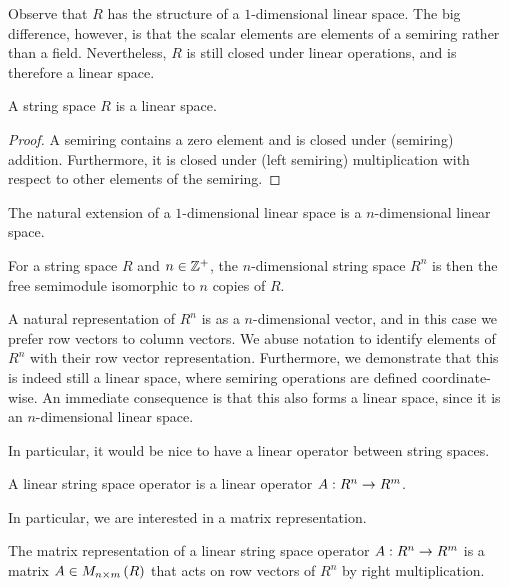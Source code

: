 Observe that \(R\) has the structure of a \(1\)-dimensional linear space.
The big difference, however, is that the scalar elements are
elements of a semiring rather than a field.
Nevertheless, \(R\) is still closed under linear operations,
and is therefore a linear space.

\begin{theorem}
  A string space \(R\) is a linear space.
\end{theorem}
\begin{proof}
  A semiring contains a zero element and is closed under
  (semiring) addition.
  Furthermore,
  it is closed under (left semiring) multiplication
  with respect to other elements of the semiring.
\end{proof}

The natural extension of a \(1\)-dimensional linear space
is a \(n\)-dimensional linear space.

\begin{definition}
  For a string space \(R\) and \(n \in \mathbb{Z}^{+}\),
  the \(n\)-dimensional string space \(R^n\) is then the
  free semimodule isomorphic to \(n\) copies of \(R\).
\end{definition}

A natural representation of \(R^n\) is as a \(n\)-dimensional vector,
and in this case we prefer row vectors to column vectors.
We abuse notation to identify elements of \(R^n\) with their
row vector representation.
Furthermore, we demonstrate that this is indeed still a linear space,
where semiring operations are defined coordinate-wise.
An immediate consequence is that this also forms a linear space,
since it is an \(n\)-dimensional linear space.


In particular, it would be nice to have a linear operator
between string spaces.

\begin{definition}
  A linear string space operator
  is a linear operator \(A : R^n \to R^m\).
\end{definition}

In particular, we are interested in a matrix representation.

\begin{definition}
  The matrix representation of a linear string space operator
  \(A : R^n \to R^m\) is a matrix
  \(A \in M_{n \times m} \left(R\right)\) that
  acts on row vectors of \(R^n\) by right multiplication.
\end{definition}

